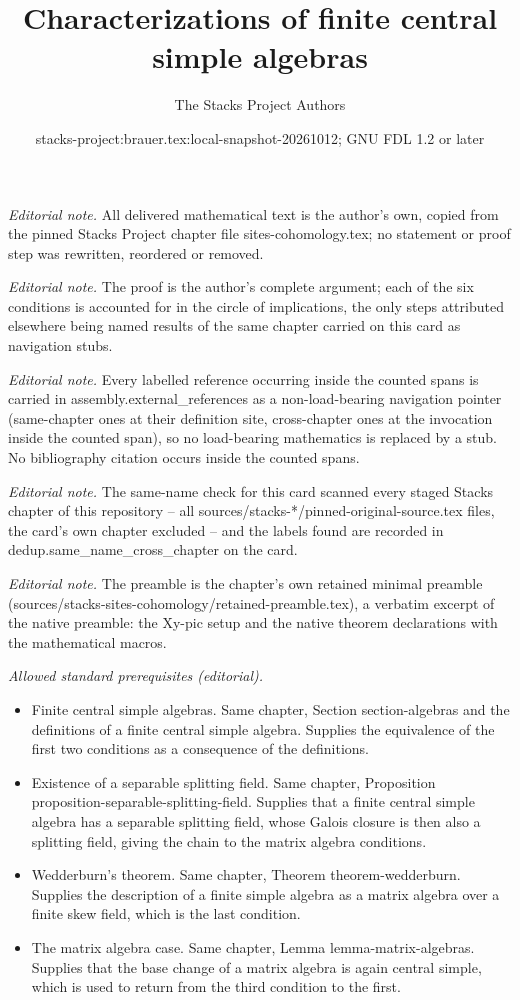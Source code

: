 \documentclass[10pt,a4paper]{amsart}
\title{Characterizations of finite central simple algebras}
\author{The Stacks Project Authors}
\date{stacks-project:brauer.tex:local-snapshot-20261012; GNU FDL 1.2 or later}
\theoremstyle{plain}
\theoremstyle{definition}
\theoremstyle{remark}
\numberwithin{equation}{subsection}
\begin{document}
\maketitle
\noindent\textit{Editorial note.} All delivered mathematical text is the author's own, copied from the pinned Stacks Project chapter file sites-cohomology.tex; no statement or proof step was rewritten, reordered or removed.\par\medskip
\noindent\textit{Editorial note.} The proof is the author's complete argument; each of the six conditions is accounted for in the circle of implications, the only steps attributed elsewhere being named results of the same chapter carried on this card as navigation stubs.\par\medskip
\noindent\textit{Editorial note.} Every labelled reference occurring inside the counted spans is carried in assembly.external\_references as a non-load-bearing navigation pointer (same-chapter ones at their definition site, cross-chapter ones at the invocation inside the counted span), so no load-bearing mathematics is replaced by a stub. No bibliography citation occurs inside the counted spans.\par\medskip
\noindent\textit{Editorial note.} The same-name check for this card scanned every staged Stacks chapter of this repository -- all sources/stacks-*/pinned-original-source.tex files, the card's own chapter excluded -- and the labels found are recorded in dedup.same\_name\_cross\_chapter on the card.\par\medskip
\noindent\textit{Editorial note.} The preamble is the chapter's own retained minimal preamble (sources/stacks-sites-cohomology/retained-preamble.tex), a verbatim excerpt of the native preamble: the Xy-pic setup and the native theorem declarations with the mathematical macros.\par\medskip
\noindent\textit{Allowed standard prerequisites (editorial).}\begin{itemize}
\item Finite central simple algebras. Same chapter, Section section-algebras and the definitions of a finite central simple algebra. Supplies the equivalence of the first two conditions as a consequence of the definitions.
\item Existence of a separable splitting field. Same chapter, Proposition proposition-separable-splitting-field. Supplies that a finite central simple algebra has a separable splitting field, whose Galois closure is then also a splitting field, giving the chain to the matrix algebra conditions.
\item Wedderburn's theorem. Same chapter, Theorem theorem-wedderburn. Supplies the description of a finite simple algebra as a matrix algebra over a finite skew field, which is the last condition.
\item The matrix algebra case. Same chapter, Lemma lemma-matrix-algebras. Supplies that the base change of a matrix algebra is again central simple, which is used to return from the third condition to the first.
\end{itemize}\medskip
\end{document}
